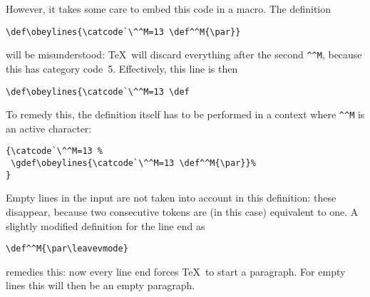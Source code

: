 \documentclass{book}
\begin{document}
However, it takes some care to embed this code in a macro.
The definition
\begin{verbatim}
\def\obeylines{\catcode`\^^M=13 \def^^M{\par}}
\end{verbatim}
will be misunderstood:
\TeX\ will discard everything
after the second \verb>^^M>, because this has category code~5.
Effectively, this line is then
\begin{verbatim}
\def\obeylines{\catcode`\^^M=13 \def
\end{verbatim}
To remedy this,
the definition itself has to be
performed in a context where \verb>^^M> is an active
character:
\begin{verbatim}
{\catcode`\^^M=13 %
 \gdef\obeylines{\catcode`\^^M=13 \def^^M{\par}}%
}
\end{verbatim}
Empty lines in the  input are not taken into account
in this definition: these disappear, because two consecutive 
tokens are (in this case) equivalent to one. 
A slightly modified definition for the line end as
\begin{verbatim}
\def^^M{\par\leavevmode}
\end{verbatim}
remedies this:
now every line end forces \TeX\ to start a paragraph. For empty
lines this will then be an empty paragraph.
\end{document}
